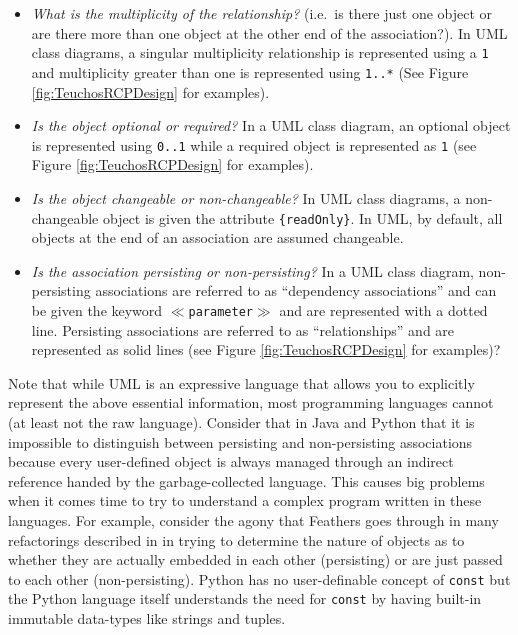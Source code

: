 \documentclass[pdf,ps2pdf,11pt]{SANDreport}
\begin{document}
\begin{itemize}

{}\item\textit{What is the multiplicity of the relationship?}  (i.e.\
is there just one object or are there more than one object at the
other end of the association?).  In UML class diagrams, a singular
multiplicity relationship is represented using a {}\texttt{1} and
multiplicity greater than one is represented using {}\texttt{1..*}
(See Figure {}\ref{fig:TeuchosRCPDesign} for examples).

{}\item\textit{Is the object optional or required?}  In a UML class
diagram, an optional object is represented using {}\texttt{0..1} while
a required object is represented as {}\texttt{1} (see Figure
{}\ref{fig:TeuchosRCPDesign} for examples).

{}\item\textit{Is the object changeable or non-changeable?}  In UML
class diagrams, a non-changeable object is given the attribute
{}\texttt{\{readOnly\}}.  In UML, by default, all objects at the end
of an association are assumed changeable.

{}\item\textit{Is the association persisting or non-persisting?}  In a
UML class diagram, non-persisting associations are referred to as
``dependency associations'' and can be given the keyword
{}\texttt{$\ll$parameter$\gg$} and are represented with a dotted line.
Persisting associations are referred to as ``relationships'' and are
represented as solid lines (see Figure {}\ref{fig:TeuchosRCPDesign}
for examples)?

\end{itemize}

Note that while UML is an expressive language that allows you to
explicitly represent the above essential information, most programming
languages cannot (at least not the raw language).  Consider that in
Java and Python that it is impossible to distinguish between
persisting and non-persisting associations because every user-defined
object is always managed through an indirect reference handed by the
garbage-collected language.  This causes big problems when it comes
time to try to understand a complex program written in these
languages.  For example, consider the agony that Feathers goes through
in many refactorings described in
{}\cite{WorkingEffectivelyWithLegacyCode05} in trying to determine the
nature of objects as to whether they are actually embedded in each
other (persisting) or are just passed to each other (non-persisting).
Python has no user-definable concept of {}\texttt{const} but the
Python language itself understands the need for {}\texttt{const} by
having built-in immutable data-types like strings and tuples.
\end{document}
